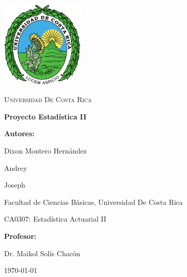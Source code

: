 \documentclass[12pt, a4paper]{article}
\begin{document}
\begin{titlepage}
    \centering

    \includegraphics[width=0.3\textwidth]{LogoUCR.png}\par\vspace{1cm}

    {\scshape\LARGE Universidad De Costa Rica \par}
    \vspace{2cm}

    {\Huge\bfseries Proyecto Estadística II\par}
    \vspace{3cm}

    {\large \bfseries Autores:\par}
    {\Large Dixon Montero Hernández \par}
    {\Large Andrey \par}
    {\Large Joseph\par}
    \vspace{0.5cm}
    {\large Facultad de Ciencias Básicas, Universidad De Costa Rica\par}
    {\large CA0307: Estadística Actuarial II}
    \vspace{2cm}

    {\large\bfseries Profesor:\par}
    {\large Dr. Maikol Solís Chacón}

    \vfill

    {\large \today\par}
\end{titlepage}
\end{document}
